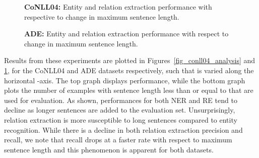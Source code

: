 \documentclass{clv3}
\begin{document}
\begin{figure}[ht]
  \begin{minipage}{.48\linewidth}
  \caption{\textbf{CoNLL04:} Entity and relation extraction performance with respective to change in maximum sentence length.
  }
  \label{fig_conll04_analysis}
  \end{minipage}
  \hfill
  \begin{minipage}{.48\linewidth}
  \caption{\textbf{ADE:} Entity and relation extraction performance with respect to change in maximum sentence length.
  }
  \label{fig_ade_analysis}
  \end{minipage}
\end{figure}

Results from these experiments are plotted in Figures~\ref{fig_conll04_analysis} and \ref{fig_ade_analysis}, for the CoNLL04 and ADE datasets respectively, such that  is varied along the horizontal -axis. The top graph displays performance, while the bottom graph plots the number of examples with sentence length less than or equal to  that are used for evaluation. As shown, performances for both NER and RE tend to decline as longer sentences are added to the evaluation set. Unsurprisingly, relation extraction is more susceptible to long sentences compared to entity recognition. While there is a decline in both relation extraction precision and recall, we note that recall drops at a faster rate with respect to maximum sentence length and this phenomenon is apparent for both datasets. 

\begin{table}[ht]
  \caption{Relation extraction performance partitioned based on ``Entity Distance'', which is defined as the \emph{number of characters} separating the subject and object entities (i.e., absolute character offset).}
  \label{tab_analysis_dist}
  \centering
  \renewcommand{\arraystretch}{1.2}
\end{table}
\end{document}
